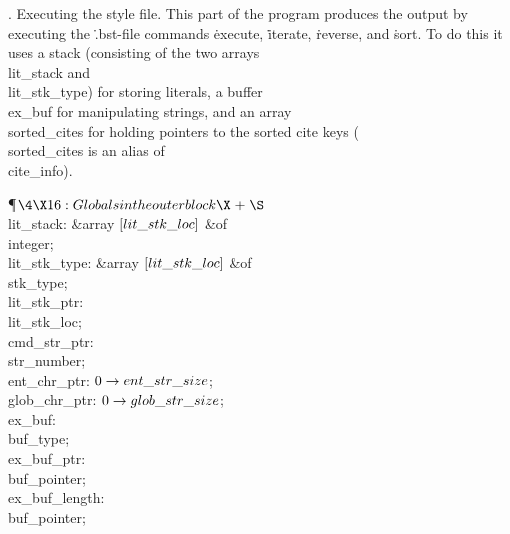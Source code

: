 .  Executing the style file.
This part of the program produces the output by executing the
\.{.bst}-file commands \.{execute}, \.{iterate}, \.{reverse}, and
\.{sort}.  To do this it uses a stack (consisting of the two arrays
\\{lit\_stack} and \\{lit\_stk\_type}) for storing literals, a buffer
\\{ex\_buf} for manipulating strings, and an array \\{sorted\_cites}
for holding pointers to the sorted cite keys (\\{sorted\_cites} is an
alias of \\{cite\_info}).

\Y\P$\4\X16:Globals in the outer block\X\mathrel{+}\S$\6
\4\\{lit\_stack}: \&{array} $[\\{lit\_stk\_loc}]$ \1\&{of}\5
\\{integer};\2\6
\4\\{lit\_stk\_type}: \&{array} $[\\{lit\_stk\_loc}]$ \1\&{of}\5
\\{stk\_type};\2\6
\4\\{lit\_stk\_ptr}: \\{lit\_stk\_loc};\6
\4\\{cmd\_str\_ptr}: \\{str\_number};\6
\4\\{ent\_chr\_ptr}: $0\to\\{ent\_str\_size}$;\6
\4\\{glob\_chr\_ptr}: $0\to\\{glob\_str\_size}$;\6
\4\\{ex\_buf}: \\{buf\_type};\6
\4\\{ex\_buf\_ptr}: \\{buf\_pointer};\6
\4\\{ex\_buf\_length}: \\{buf\_pointer};\6
